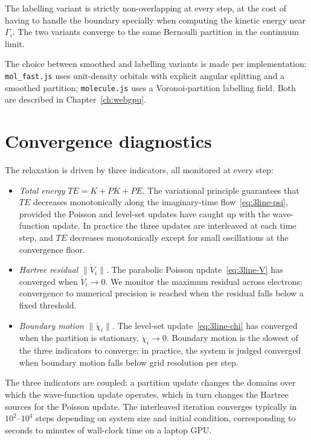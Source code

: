 The labelling variant is strictly non-overlapping at every step, at the cost of having to handle the boundary specially when computing the kinetic energy near $\Gamma_i$. The two variants converge to the same Bernoulli partition in the continuum limit.

The choice between smoothed and labelling variants is made per implementation: \texttt{mol\_fast.js} uses unit-density orbitals with explicit angular splitting and a smoothed partition; \texttt{molecule.js} uses a Voronoi-partition labelling field. Both are described in Chapter~\ref{ch:webgpu}.

\section{Convergence diagnostics}\label{sec:convergence}

The relaxation is driven by three indicators, all monitored at every step:

\begin{itemize}
\item \emph{Total energy} $TE = K + PK + PE$. The variational principle guarantees that $TE$ decreases monotonically along the imaginary-time flow~\eqref{eq:3line-psi}, provided the Poisson and level-set updates have caught up with the wave-function update. In practice the three updates are interleaved at each time step, and $TE$ decreases monotonically except for small oscillations at the convergence floor.
\item \emph{Hartree residual} $\|\dot V_i\|$. The parabolic Poisson update~\eqref{eq:3line-V} has converged when $\dot V_i \to 0$. We monitor the maximum residual across electrons; convergence to numerical precision is reached when the residual falls below a fixed threshold.
\item \emph{Boundary motion} $\|\dot \chi_i\|$. The level-set update~\eqref{eq:3line-chi} has converged when the partition is stationary, $\dot \chi_i \to 0$. Boundary motion is the slowest of the three indicators to converge; in practice, the system is judged converged when boundary motion falls below grid resolution per step.
\end{itemize}

The three indicators are coupled: a partition update changes the domains over which the wave-function update operates, which in turn changes the Hartree sources for the Poisson update. The interleaved iteration converges typically in $10^2$--$10^4$ steps depending on system size and initial condition, corresponding to seconds to minutes of wall-clock time on a laptop GPU.

